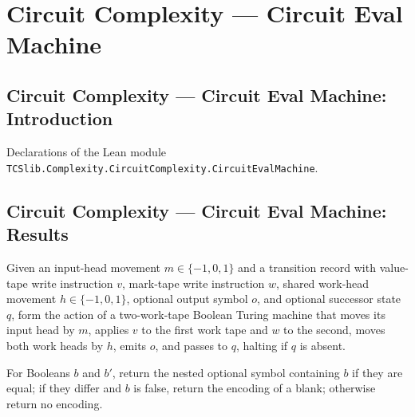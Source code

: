 \section{Circuit Complexity --- Circuit Eval Machine}
\subsection*{Circuit Complexity --- Circuit Eval Machine: Introduction}

Declarations of the Lean module \texttt{TCSlib.Complexity.CircuitComplexity.CircuitEvalMachine}.

\subsection*{Circuit Complexity --- Circuit Eval Machine: Results}

\begin{definition}
\label{BoolCircuit.CircuitEval.LA.toAct}
\leanok
{}
Given an input-head movement $m\in\{-1,0,1\}$ and a transition record with value-tape
write instruction $v$, mark-tape write instruction $w$, shared work-head movement
$h\in\{-1,0,1\}$, optional output symbol $o$, and optional successor state $q$, form the
action of a two-work-tape Boolean Turing machine that moves its input head by $m$,
applies $v$ to the first work tape and $w$ to the second, moves both work heads by $h$,
emits $o$, and passes to $q$, halting if $q$ is absent.
\end{definition}

\begin{definition}
\label{BoolCircuit.CircuitEval.pairSym}
\leanok
For Booleans $b$ and $b'$, return the nested optional symbol containing $b$ if they are
equal; if they differ and $b$ is false, return the encoding of a blank; otherwise return
no encoding.
\end{definition}

